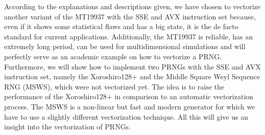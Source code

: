 \documentclass{stdlocal}
\begin{document}
  According to the explanations and descriptions given, we have chosen to vectorize another variant of the MT19937 with the SSE and AVX instruction set because, even if it shows some statistical flaws and has a big state, it is the de facto standard for current applications.
  Additionally, the MT19937 is reliable, has an extremely long period, can be used for multidimensional simulations and will perfectly serve as an academic example on how to vectorize a PRNG.
  Furthermore, we will show how to implement two PRNGs with the SSE and AVX instruction set, namely the Xoroshiro128+ and the Middle Square Weyl Sequence RNG (MSWS), which were not vectorized yet.
  The idea is to raise the performance of the Xoroshiro128+ in comparison to an automatic vectorization process.
  The MSWS is a non-linear but fast and modern generator for which we have to use a slightly different vectorization technique.
  All this will give us an insight into the vectorization of PRNGs.
\end{document}

